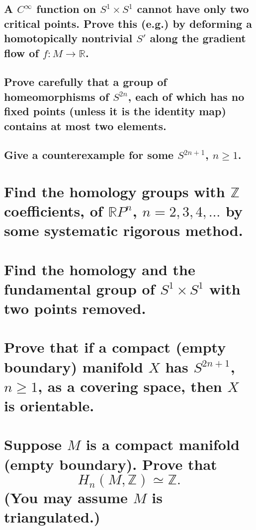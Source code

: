\documentclass[10pt]{article}
\newcommand{\advsection}{\addtocounter{section}{1} \setcounter{subsection}{0}}
\begin{document}
\subsection{A $C^\infty$ function on $S^1 \times S^1$ cannot have only two critical points. Prove
  this (e.g.) by deforming a homotopically nontrivial $S'$ along the gradient flow of $f: M \to \mathbb{R} $. }

\advsection{}

\subsection{Prove carefully that a group of homeomorphisms of $S^{2n}$, each of which has no fixed
  points (unless it is the identity map) contains at most two elements.}

\subsection{Give a counterexample for some $S^{2n+1}$, $n \geq 1$.}

\section{Find the homology groups with $\mathbb{Z}$ coefficients, of $\mathbb{R} P^n$, $n=2,3,4,
  \dots$ by some systematic rigorous method.}

\section{Find the homology and the fundamental group of $S^1 \times S^1$ with two points removed.}

\section{Prove that if a compact (empty boundary) manifold $X$ has $S^{2n+1}$, $n \geq 1$, as a
  covering space, then $X$ is orientable.}

\section{Suppose $M$ is a compact manifold (empty boundary). Prove that
$$H_n(M,\mathbb{Z} ) \simeq \mathbb{Z} .$$
(You may assume $M$ is triangulated.)}
\end{document}
